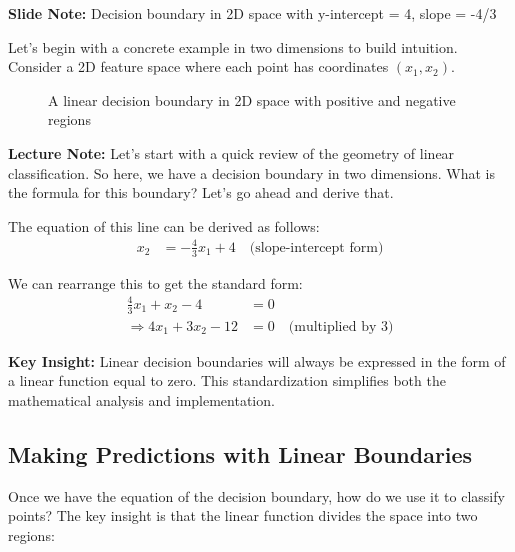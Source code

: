 \documentclass{article}
\newcommand{\slidenote}[1]{\begin{mdframed}[backgroundcolor=blue!10, linewidth=0pt]
\textbf{Slide Note:} #1
\end{mdframed}}
\newcommand{\lecturenote}[1]{\begin{mdframed}[backgroundcolor=green!10, linewidth=0pt]
\textbf{Lecture Note:} #1
\end{mdframed}}
\newcommand{\insight}[1]{\begin{mdframed}[backgroundcolor=yellow!10, linewidth=0pt]
\textbf{Key Insight:} #1
\end{mdframed}}
\begin{document}
\slidenote{Decision boundary in 2D space with y-intercept = 4, slope = -4/3}

Let's begin with a concrete example in two dimensions to build intuition. Consider a 2D feature space where each point has coordinates $(x_1, x_2)$.

\begin{figure}[h]
\centering
{}
\caption{A linear decision boundary in 2D space with positive and negative regions}
\end{figure}

\lecturenote{Let's start with a quick review of the geometry of linear classification. So here, we have a decision boundary in two dimensions. What is the formula for this boundary? Let's go ahead and derive that.}

The equation of this line can be derived as follows:
\begin{align}
    x_2 &= -\frac{4}{3}x_1 + 4 \quad \text{(slope-intercept form)}
\end{align}

We can rearrange this to get the standard form:
\begin{align}
    \frac{4}{3}x_1 + x_2 - 4 &= 0\\
    \Rightarrow 4x_1 + 3x_2 - 12 &= 0 \quad \text{(multiplied by 3)}
\end{align}

\insight{Linear decision boundaries will always be expressed in the form of a linear function equal to zero. This standardization simplifies both the mathematical analysis and implementation.}

\subsection{Making Predictions with Linear Boundaries}

Once we have the equation of the decision boundary, how do we use it to classify points? The key insight is that the linear function divides the space into two regions:
\end{document}
